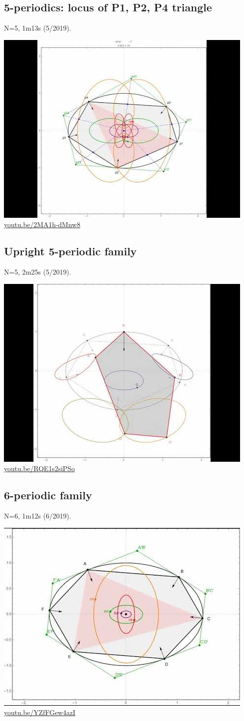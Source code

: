 \documentclass[12pt]{amsart}
\begin{document}
\subsection{5-periodics: locus of P1, P2, P4 triangle}
\label{vid:2MA1h-dMnw8}
\noindent N=5, 1m13s (5/2019). 
\begin{center}\includegraphics[width=.5\textwidth]{pics/2MA1h-dMnw8.jpg} \\ 
\href{https://youtu.be/2MA1h-dMnw8}{\url{youtu.be/2MA1h-dMnw8}}\end{center}
% 
\subsection{Upright 5-periodic family}
\label{vid:RQE1s2siPSo}
\noindent N=5, 2m25s (5/2019). 
\begin{center}\includegraphics[width=.5\textwidth]{pics/RQE1s2siPSo.jpg} \\ 
\href{https://youtu.be/RQE1s2siPSo}{\url{youtu.be/RQE1s2siPSo}}\end{center}
% 
\subsection{6-periodic family}
\label{vid:YZfFGew4azI}
\noindent N=6, 1m12s (6/2019). 
\begin{center}\includegraphics[width=.5\textwidth]{pics/YZfFGew4azI.jpg} \\ 
\href{https://youtu.be/YZfFGew4azI}{\url{youtu.be/YZfFGew4azI}}\end{center}
% 
\end{document}
